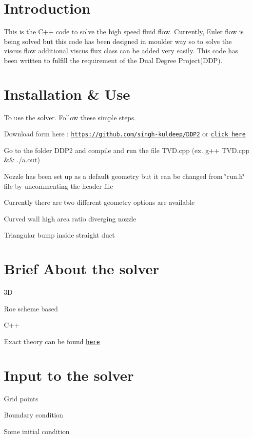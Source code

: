 \hypertarget{index_intro_sec}{}\section{Introduction}\label{index_intro_sec}
This is the C++ code to solve the high speed fluid flow. Currently, Euler flow is being solved but this code has been designed in moulder way so to solve the viscus flow additional viscus flux class can be added very easily. This code has been written to fulfill the requirement of the Dual Degree Project(\+D\+D\+P).\hypertarget{index_install_sec}{}\section{Installation \& Use}\label{index_install_sec}
To use the solver. Follow these simple steps.
\begin{DoxyItemize}
\item Download form here \+: \href{https://github.com/singh-kuldeep/DDP2}{\tt https\+://github.\+com/singh-\/kuldeep/\+D\+D\+P2} or \href{https://github.com/singh-kuldeep/DDP2}{\tt click here}
\item Go to the folder D\+D\+P2 and compile and run the file T\+V\+D.\+cpp (ex. g++ T\+V\+D.\+cpp \&\& ./a.out)
\item Nozzle has been set up as a default geometry but it can be changed from \char`\"{}run.\+h\char`\"{} file by uncommenting the header file
\item Currently there are two different geometry options are available
\begin{DoxyEnumerate}
\item Curved wall high area ratio diverging nozzle
\item Triangular bump inside straight duct
\end{DoxyEnumerate}
\end{DoxyItemize}\hypertarget{index_brief}{}\section{Brief About the solver}\label{index_brief}

\begin{DoxyItemize}
\item 3D
\item Roe scheme based
\item C++
\item Exact theory can be found \href{https://drive.google.com/open?id=0B9x_nh0D_HhzMnBjc0w5MmJpcnc}{\tt here}
\end{DoxyItemize}\hypertarget{index_input}{}\section{Input to the solver}\label{index_input}

\begin{DoxyItemize}
\item Grid points
\item Boundary condition
\item Some initial condition 
\end{DoxyItemize}